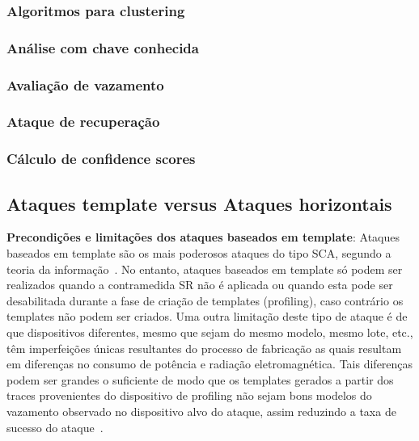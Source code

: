 \subsubsection{Algoritmos para clustering}

\subsubsection{Análise com chave conhecida}

\subsubsection{Avaliação de vazamento} %

\subsubsection{Ataque de recuperação}

\subsubsection{Cálculo de confidence scores}


\subsection{Ataques template versus Ataques horizontais}

\noindent \textbf{Precondições e limitações dos ataques baseados em template}: Ataques baseados em template são os mais poderosos ataques do tipo SCA, segundo a teoria da informação~\cite{ChariRaoRohatgi2003}. No entanto, ataques baseados em template só podem ser realizados quando a contramedida SR não é aplicada ou quando esta pode ser desabilitada durante a fase de criação de templates (profiling), caso contrário os templates não podem ser criados. Uma outra limitação deste tipo de ataque é de que dispositivos diferentes, mesmo que sejam do mesmo modelo, mesmo lote, etc., têm imperfeições únicas resultantes do processo de fabricação as quais resultam em diferenças no consumo de potência e radiação eletromagnética. Tais diferenças podem ser grandes o suficiente de modo que os templates gerados a partir dos traces provenientes do dispositivo de profiling não sejam bons modelos do vazamento observado no dispositivo alvo do ataque, assim reduzindo a taxa de sucesso do ataque~\cite{ElaabidGuilley2012}.



